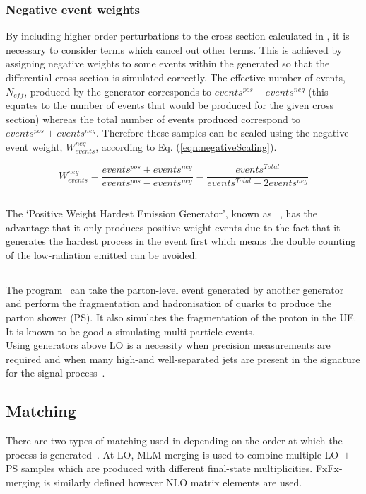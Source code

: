 \subsubsection{Negative event weights}
By including higher order perturbations to the cross section calculated in \aMCATNLO, it is necessary to consider terms which cancel out other terms. This is achieved by assigning negative weights to some events within the generated so that the differential cross section is simulated correctly. The effective number of events, $N_{eff}$, produced by the generator corresponds to $events^{pos} - events^{neg}$ (this equates to the number of events that would be produced for the given cross section) whereas the total number of events produced correspond to $events^{pos} + events^{neg}$. Therefore these samples can be scaled using the negative event weight, $W_{events}^{neg}$, according to Eq. (\ref{eqn:negativeScaling}).

\begin{equation}
\label{eqn:negativeScaling}
W_{events}^{neg} = \frac{events^{pos} + events^{neg}}{events^{pos} - events^{neg}} = \frac{events^{Total}}{ events^{Total} - 2events^{neg}}
\end{equation}


\subsection{\POWHEG}
The `Positive Weight Hardest Emission Generator', known as \POWHEG~\cite{POWHEG}, has the advantage that it only produces positive weight events due to the fact that it generates the hardest process in the event first which means the double counting of the low-\pt radiation emitted can be avoided.  
\subsection{\PYTHIA}
The \PYTHIA program~\cite{pythia} can take the parton-level event generated by another generator and perform the fragmentation and hadronisation of quarks to produce the parton shower (PS). It also simulates the fragmentation of the proton in the UE. It is known to be good a simulating multi-particle events.\\

Using generators above LO is a necessity when precision measurements are required and when many high-\pt and well-separated jets are present in the signature for the signal process~\cite{Degrande:2014sta}. 

\subsection{Matching}
There are two types of matching used in \MADGRAPH depending on the order at which the process is generated~\cite{Degrande:2014sta}. At LO, MLM-merging is used to combine multiple LO$~+~$PS samples which are produced with different final-state multiplicities. FxFx-merging is similarly defined however NLO matrix elements are used.



